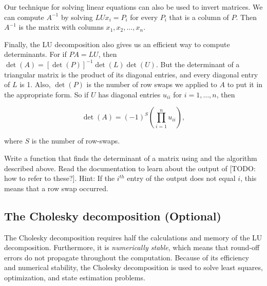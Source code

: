 Our technique for solving linear equations can also be used to invert matrices. We can compute $A^{-1}$ by solving $LUx_i = P_i$ for every $P_i$ that is a column of $P$. Then $A^{-1}$ is the matrix with columns $x_1, x_2, \ldots, x_n$. 

Finally, the LU decomposition also gives us an efficient way to compute determinants. For if $PA=LU$, then $\det(A) = [\det(P)]^{-1}\det(L)\det(U)$. But the determinant of a triangular matrix is the product of its diagonal entries, and every diagonal entry of $L$ is 1. Also, $\det(P)$ is the number of row swaps we applied to $A$ to put it in the appropriate form. So if $U$ has diagonal entries $u_{ii}$ for $i=1, \ldots, n$, then

\[
\det(A) = (-1)^S\left(\displaystyle\prod_{i=1}^nu_{ii}\right),
\]

where $S$ is the number of row-swaps.



%

\begin{problem}[Optional]
\label{prob:det}
Write a function that finds the determinant of a matrix using  and the algorithm described above. Read the documentation to learn about the output of [TODO: how to refer to these?].
Hint: If the $i^{th}$ entry of the output  does not equal $i$, this means that a row swap occurred.
\end{problem}

\subsection*{The Cholesky decomposition (Optional)}
The Cholesky decomposition requires half the calculations and memory of the LU decomposition. Furthermore, it is \emph{numerically stable}, which means that round-off errors do not propagate throughout the computation. Because of its efficiency and numerical stability, the Cholesky decomposition is used to solve least squares, optimization, and state estimation problems.

